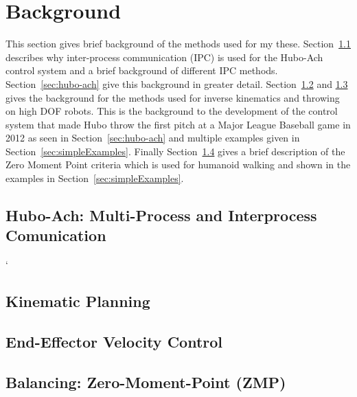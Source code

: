 			
			
			
			
			
			
			

		
	\section{Background}\label{sec:background}

This section gives brief background of the methods used for my these.
Section~\ref{sec:back:hubo-ach} describes why inter-process communication (IPC) is used for the Hubo-Ach control system and a brief background of different IPC methods.
Section~\ref{sec:hubo-ach} give this background in greater detail.
Section~\ref{sec:back:ik} and \ref{sec:back:eefvelos} gives the background for the methods used for inverse kinematics and throwing on high DOF robots.
This is the background to the development of the control system that made Hubo throw the first pitch at a Major League Baseball game in 2012 as seen in Section~\ref{sec:hubo-ach} and multiple examples given in Section~\ref{sec:simpleExamples}.
Finally Section~\ref{sec:zmp} gives a brief description of the Zero Moment Point criteria which is used for humanoid walking and shown in the examples in Section~\ref{sec:simpleExamples}.

		
		\subsection{Hubo-Ach: Multi-Process and Interprocess Comunication}\label{sec:back:hubo-ach}
`	    		
		\subsection{Kinematic Planning}\label{sec:back:ik}
			
		\subsection{End-Effector Velocity Control}\label{sec:back:eefvelos}
			
%			
		\subsection{Balancing: Zero-Moment-Point (ZMP)}\label{sec:zmp}
			
	


